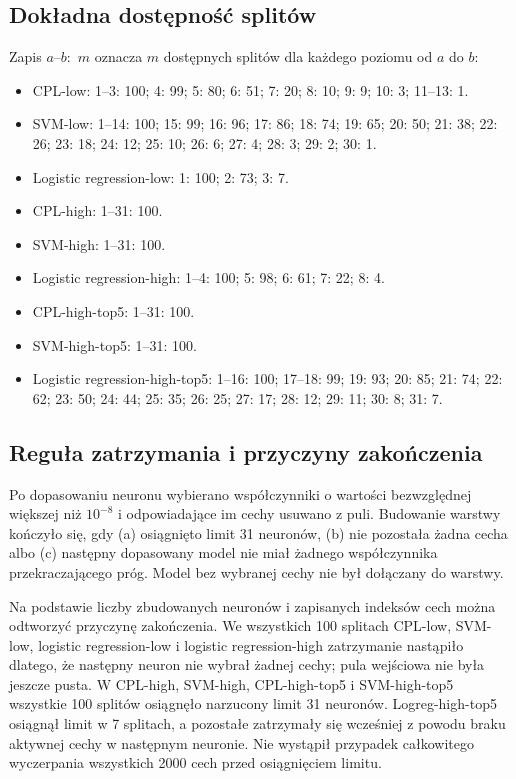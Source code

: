 \documentclass[11pt,a4paper]{article}
\begin{document}
\subsection{Dokładna dostępność splitów}

Zapis \mbox{$a$--$b$: $m$} oznacza $m$ dostępnych splitów dla każdego poziomu od $a$ do $b$:

\begin{itemize}
\item CPL-low: 1--3: 100; 4: 99; 5: 80; 6: 51; 7: 20; 8: 10; 9: 9; 10: 3; 11--13: 1.
\item SVM-low: 1--14: 100; 15: 99; 16: 96; 17: 86; 18: 74; 19: 65; 20: 50; 21: 38;
22: 26; 23: 18; 24: 12; 25: 10; 26: 6; 27: 4; 28: 3; 29: 2; 30: 1.
\item Logistic regression-low: 1: 100; 2: 73; 3: 7.
\item CPL-high: 1--31: 100.
\item SVM-high: 1--31: 100.
\item Logistic regression-high: 1--4: 100; 5: 98; 6: 61; 7: 22; 8: 4.
\item CPL-high-top5: 1--31: 100.
\item SVM-high-top5: 1--31: 100.
\item Logistic regression-high-top5: 1--16: 100; 17--18: 99; 19: 93; 20: 85; 21: 74; 22: 62;
23: 50; 24: 44; 25: 35; 26: 25; 27: 17; 28: 12; 29: 11; 30: 8; 31: 7.
\end{itemize}

\subsection{Reguła zatrzymania i przyczyny zakończenia}

Po dopasowaniu neuronu wybierano współczynniki o wartości bezwzględnej większej niż $10^{-8}$ i odpowiadające
im cechy usuwano z puli. Budowanie warstwy kończyło się, gdy (a) osiągnięto limit 31 neuronów, (b) nie
pozostała żadna cecha albo (c) następny dopasowany model nie miał żadnego współczynnika przekraczającego
próg. Model bez wybranej cechy nie był dołączany do warstwy.

Na podstawie liczby zbudowanych neuronów i zapisanych indeksów cech można odtworzyć przyczynę zakończenia.
We wszystkich 100 splitach CPL-low, SVM-low, logistic regression-low i logistic regression-high zatrzymanie
nastąpiło dlatego, że następny neuron nie wybrał żadnej cechy; pula wejściowa nie była jeszcze pusta.
W CPL-high, SVM-high, CPL-high-top5 i SVM-high-top5 wszystkie 100 splitów osiągnęło narzucony limit 31
neuronów. Logreg-high-top5 osiągnął limit w 7 splitach, a pozostałe zatrzymały się wcześniej z powodu braku
aktywnej cechy w następnym neuronie. Nie wystąpił przypadek
całkowitego wyczerpania wszystkich 2000 cech przed osiągnięciem limitu.
\end{document}
